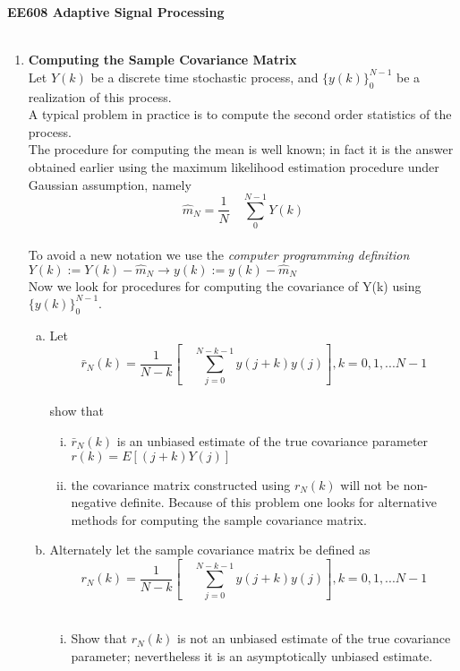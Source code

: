 \documentclass[journal,12pt,onecolumn]{IEEEtran}
\begin{document}
\centering \textbf{EE608  Adaptive Signal Processing}\\
\\
\bigskip
\begin{enumerate}
\item\textbf{Computing the Sample Covariance Matrix}\\
\smallskip
Let $Y(k)$ be a discrete time stochastic process, and $\{y(k)\}_0^{N-1}$ be a realization of this process.\\

A typical problem in practice is to compute the second order statistics of the process.\\
\smallskip
The procedure for computing the mean is well known; in fact it is the answer obtained earlier
using the maximum likelihood estimation procedure under Gaussian assumption, namely
\bigskip
\bigskip
$$\hat{m}_N=\frac{1}{N}\quad\sum_0^{N-1}Y(k)$$\\
\bigskip
To avoid a new notation we use the \textit{computer programming definition}\\
\bigskip
\bigskip
$Y(k):=Y(k)-\hat{m}_N\rightarrow y(k):=y(k)-\hat{m}_N$\\
\bigskip
Now we look for procedures for computing the covariance of Y(k) using $\{y(k)\}_0^{N-1}.$
\begin{enumerate}[(a)]
\item Let\\
\bigskip
$$\bar{r}_N{(k)}=\frac{1}{N-k}[{\quad\sum_{j=0}^{N-k-1}}{y(j+k)}y(j)], k=0,1,...N-1 $$\\
show that\\
\begin{enumerate}[i.]
\item $\bar{r}_N{(k)}$ is an unbiased estimate of the true covariance parameter $r(k)=E[(j+k)Y(j)]$
\item the covariance matrix constructed using $r_N{(k)}$ will not be non-negative definite. Because of this problem one looks for alternative methods for computing the sample
covariance matrix.
\end{enumerate}
\item Alternately let the sample covariance matrix be defined as
$$r_N{(k)}=\frac{1}{N-k}[{\quad\sum_{j=0}^{N-k-1}}{y(j+k)}y(j)], k=0,1,...N-1 $$\\
\begin{enumerate}[i.]
\item Show that $r_N{(k)}$ is not an unbiased estimate of the true covariance parameter; nevertheless it is an asymptotically unbiased estimate.

\end{enumerate}
\end{enumerate}
\end{enumerate}
\end{document}
